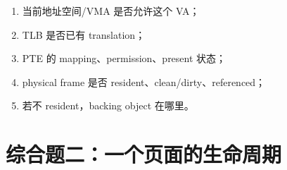 \documentclass[11pt,a4paper]{ctexart}
\begin{document}
\begin{method}[综合题推演时必须记录五类状态]
\begin{enumerate}
  \item 当前地址空间/VMA 是否允许这个 VA；
  \item TLB 是否已有 translation；
  \item PTE 的 mapping、permission、present 状态；
  \item physical frame 是否 resident、clean/dirty、referenced；
  \item 若不 resident，backing object 在哪里。
\end{enumerate}
\end{method}

\section{综合题二：一个页面的生命周期}
\end{document}
